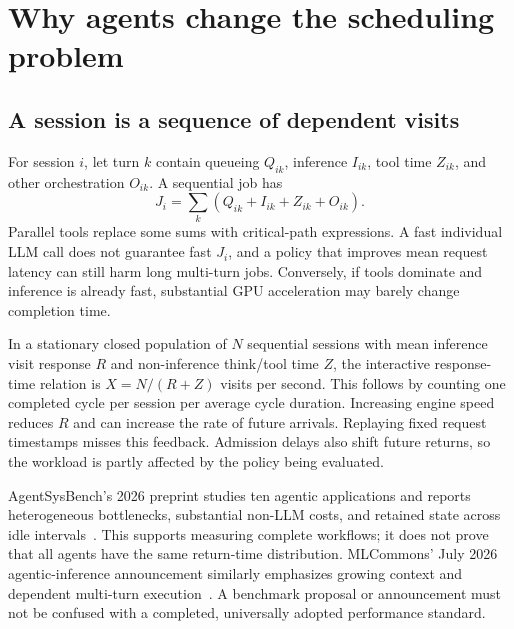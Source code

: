 \section{Why agents change the scheduling problem}
\label{sec:agents}
\subsection{A session is a sequence of dependent visits}
For session $i$, let turn $k$ contain queueing $Q_{ik}$, inference $I_{ik}$,
tool time $Z_{ik}$, and other orchestration $O_{ik}$. A sequential job has
\begin{equation}
 J_i=\sum_k(Q_{ik}+I_{ik}+Z_{ik}+O_{ik}).
 \label{eq:job}
\end{equation}
Parallel tools replace some sums with critical-path expressions. A fast
individual LLM call does not guarantee fast $J_i$, and a policy that improves
mean request latency can still harm long multi-turn jobs. Conversely, if tools
dominate and inference is already fast, substantial GPU acceleration may barely
change completion time.


In a stationary closed population of $N$ sequential sessions with mean inference
visit response $R$ and non-inference think/tool time $Z$, the interactive
response-time relation is $X=N/(R+Z)$ visits per second. This follows by counting
one completed cycle per session per average cycle duration. Increasing engine
speed reduces $R$ and can increase the rate of future arrivals. Replaying fixed
request timestamps misses this feedback. Admission delays also shift future
returns, so the workload is partly affected by the policy being evaluated.

AgentSysBench's 2026 preprint studies ten agentic applications and reports
heterogeneous bottlenecks, substantial non-LLM costs, and retained state across
idle intervals~\cite{agentbench}. This supports measuring complete workflows;
it does not prove that all agents have the same return-time distribution.
MLCommons' July 2026 agentic-inference announcement similarly emphasizes growing
context and dependent multi-turn execution~\cite{mlperf}. A benchmark proposal
or announcement must not be confused with a completed, universally adopted
performance standard.

